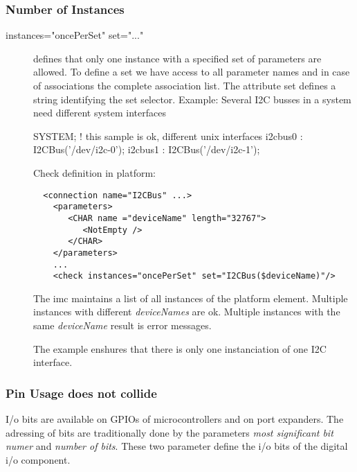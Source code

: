 \subsubsection{Number of Instances}
\begin{description}
\item[instances="oncePerSet" set="..."] defines that only one instance with a 
  specified set of parameters are allowed. To define a set we have access to 
  all parameter names and in case of associations the complete association list.
  The attribute set defines a string identifying the set selector. 
  \newline
  Example: Several I2C busses in a system need different system interfaces

  \begin{PEARLCode}
  SYSTEM;
     ! this sample is ok, different unix interfaces
     i2cbus0 : I2CBus('/dev/i2c-0');
     i2cbus1 : I2CBus('/dev/i2c-1');
  \end{PEARLCode}

  Check definition in platform:
  
  \begin{verbatim}
  <connection name="I2CBus" ...>
    <parameters>
       <CHAR name ="deviceName" length="32767">
          <NotEmpty />
       </CHAR>
    </parameters>
    ...
    <check instances="oncePerSet" set="I2CBus($deviceName)"/>
  \end{verbatim}

  The imc maintains a list of all instances of the platform element.
  Multiple instances with different \textit{deviceNames} are ok.
  Multiple instances with the same \textit{deviceName} result is
  error messages.

  The example enshures that there is only one instanciation of 
  one I2C interface. 
\end{description}

\subsubsection{Pin Usage does not collide}
I/o bits are available on GPIOs of microcontrollers and on port expanders.
The adressing of bits are traditionally done by the parameters
\textit{most significant bit numer} and
\textit{number of bits}. These two parameter define the i/o bits of the 
digital i/o component.

